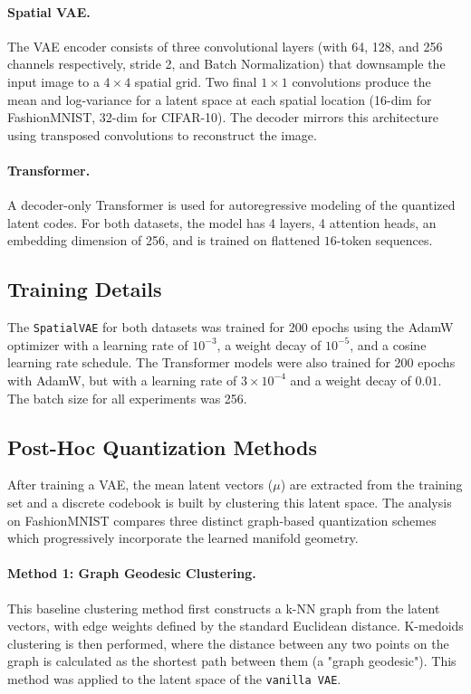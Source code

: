 \documentclass{article}
\begin{document}
\paragraph{Spatial VAE.} The VAE encoder consists of three convolutional layers (with 64, 128, and 256 channels respectively, stride 2, and Batch Normalization) that downsample the input image to a $4 \times 4$ spatial grid. 
Two final $1 \times 1$ convolutions produce the mean and log-variance for a latent space at each spatial location (16-dim for FashionMNIST, 32-dim for CIFAR-10). The decoder mirrors this architecture using transposed convolutions to reconstruct the image.

\paragraph{Transformer.} A decoder-only Transformer is used for autoregressive modeling of the quantized latent codes. For both datasets, the model has 4 layers, 4 attention heads, an embedding dimension of 256, and is trained on flattened $16$-token sequences.

\subsection{Training Details}
The \texttt{SpatialVAE} for both datasets was trained for 200 epochs using the AdamW optimizer with a learning rate of $10^{-3}$, a weight decay of $10^{-5}$, and a cosine learning rate schedule. 
The Transformer models were also trained for 200 epochs with AdamW, but with a learning rate of $3 \times 10^{-4}$ and a weight decay of $0.01$. The batch size for all experiments was 256.

\subsection{Post-Hoc Quantization Methods}
After training a VAE, the mean latent vectors ($\mu$) are extracted from the training set and a discrete codebook is built by clustering this latent space. 
The analysis on FashionMNIST compares three distinct graph-based quantization schemes which progressively incorporate the learned manifold geometry.

\paragraph{Method 1: Graph Geodesic Clustering.}
This baseline clustering method first constructs a k-NN graph from the latent vectors, with edge weights defined by the standard Euclidean distance. 
K-medoids clustering is then performed, where the distance between any two points on the graph is calculated as the shortest path between them (a "graph geodesic"). 
This method was applied to the latent space of the \texttt{vanilla VAE}.
\end{document}
